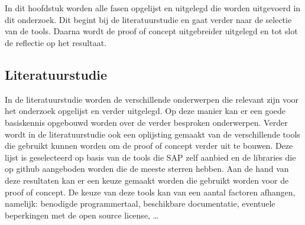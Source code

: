 
\chapter{}%
\label{ch:methodologie}


In dit hoofdstuk worden alle fasen opgelijst en uitgelegd die worden uitgevoerd in dit onderzoek. Dit begint bij de literatuurstudie en gaat verder naar de selectie van de tools. Daarna wordt de proof of concept uitgebreider uitgelegd en tot slot de reflectie op het resultaat.

\section{Literatuurstudie}

In de literatuurstudie worden de verschillende onderwerpen die relevant zijn voor het onderzoek opgelijst en verder uitgelegd. Op deze manier kan er een goede basiskennis opgebouwd worden over de verder besproken onderwerpen. Verder wordt in de literatuurstudie ook een oplijsting gemaakt van de verschillende tools die gebruikt kunnen worden om de proof of concept verder uit te bouwen. Deze lijst is geselecteerd op basis van de tools die SAP zelf aanbied en de libraries die op github aangeboden worden die de meeste sterren hebben. Aan de hand van deze resultaten kan er een keuze gemaakt worden die gebruikt worden voor de proof of concept. De keuze van deze tools kan van een aantal factoren afhangen, namelijk: benodigde programmertaal, beschikbare documentatie, eventuele beperkingen met de open source license, \ldots

